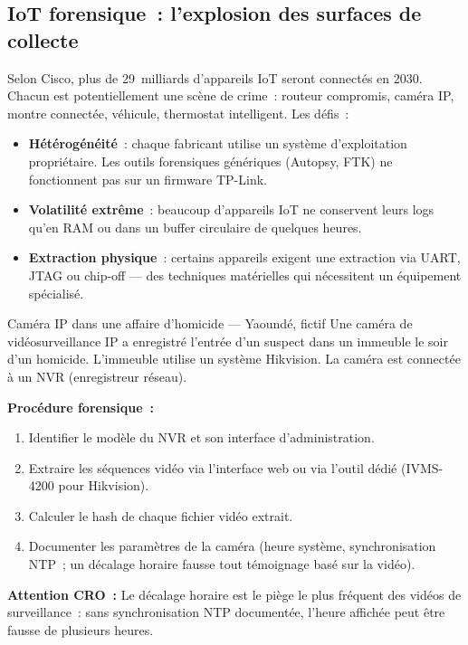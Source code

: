 \subsection{IoT forensique~: l'explosion des surfaces de collecte}

Selon Cisco, plus de 29~milliards d'appareils IoT seront connectés en 2030.
Chacun est potentiellement une scène de crime~: routeur compromis, caméra IP,
montre connectée, véhicule, thermostat intelligent. Les défis~:

\begin{itemize}
    \item \textbf{Hétérogénéité}~: chaque fabricant utilise un système
          d'exploitation propriétaire. Les outils forensiques génériques
          (Autopsy, FTK) ne fonctionnent pas sur un firmware TP-Link.
    \item \textbf{Volatilité extrême}~: beaucoup d'appareils IoT ne
          conservent leurs logs qu'en RAM ou dans un buffer circulaire
          de quelques heures.
    \item \textbf{Extraction physique}~: certains appareils exigent
          une extraction via UART, JTAG ou chip-off --- des techniques
          matérielles qui nécessitent un équipement spécialisé.
\end{itemize}

\begin{boxscenario}{Caméra IP dans une affaire d'homicide --- Yaoundé, fictif}
Une caméra de vidéosurveillance IP a enregistré l'entrée d'un suspect dans
un immeuble le soir d'un homicide. L'immeuble utilise un système Hikvision.
La caméra est connectée à un NVR (enregistreur réseau).

\textbf{Procédure forensique~:}
\begin{enumerate}
    \item Identifier le modèle du NVR et son interface d'administration.
    \item Extraire les séquences vidéo via l'interface web ou via
          l'outil dédié (IVMS-4200 pour Hikvision).
    \item Calculer le hash de chaque fichier vidéo extrait.
    \item Documenter les paramètres de la caméra (heure système,
          synchronisation NTP~; un décalage horaire fausse tout
          témoignage basé sur la vidéo).
\end{enumerate}

\textbf{Attention CRO~:} 
Le décalage horaire est le piège le plus fréquent des vidéos de
surveillance~: sans synchronisation NTP documentée, l'heure affichée
peut être fausse de plusieurs heures.
\end{boxscenario}

